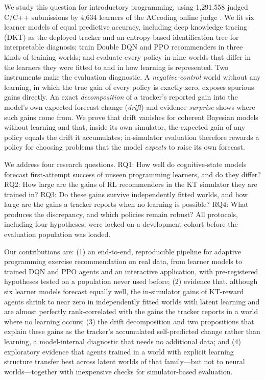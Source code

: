 \documentclass[a4paper,preprint,12pt,authoryear]{elsarticle}
\begin{document}
We study this question for introductory programming, using 1,291,558 judged C/C++ submissions by 4,634 learners of the ACcoding online judge \citep{chen2024accoding}. We fit six learner models of equal predictive accuracy, including deep knowledge tracing (DKT) as the deployed tracker and an entropy-based identification tree for interpretable diagnosis; train Double DQN and PPO recommenders in three kinds of training worlds; and evaluate every policy in nine worlds that differ in the learners they were fitted to and in how learning is represented. Two instruments make the evaluation diagnostic. A \emph{negative-control} world without any learning, in which the true gain of every policy is exactly zero, exposes spurious gains directly. An exact \emph{decomposition} of a tracker's reported gain into the model's own expected forecast change (\emph{drift}) and evidence \emph{surprise} shows where such gains come from. We prove that drift vanishes for coherent Bayesian models without learning and that, inside its own simulator, the expected gain of any policy equals the drift it accumulates; in-simulator evaluation therefore rewards a policy for choosing problems that the model \emph{expects} to raise its own forecast.

We address four research questions. RQ1: How well do cognitive-state models forecast first-attempt success of unseen programming learners, and do they differ? RQ2: How large are the gains of RL recommenders in the KT simulator they are trained in? RQ3: Do these gains survive independently fitted worlds, and how large are the gains a tracker reports when no learning is possible? RQ4: What produces the discrepancy, and which policies remain robust? All protocols, including four hypotheses, were locked on a development cohort before the evaluation population was loaded.

Our contributions are: (1) an end-to-end, reproducible pipeline for adaptive programming exercise recommendation on real data, from learner models to trained DQN and PPO agents and an interactive application, with pre-registered hypotheses tested on a population never used before; (2) evidence that, although six learner models forecast equally well, the in-simulator gains of KT-reward agents shrink to near zero in independently fitted worlds with latent learning and are almost perfectly rank-correlated with the gains the tracker reports in a world where no learning occurs; (3) the drift decomposition and two propositions that explain these gains as the tracker's accumulated self-predicted change rather than learning, a model-internal diagnostic that needs no additional data; and (4) exploratory evidence that agents trained in a world with explicit learning structure transfer best across latent worlds of that family---but not to neural worlds---together with inexpensive checks for simulator-based evaluation.
\end{document}
